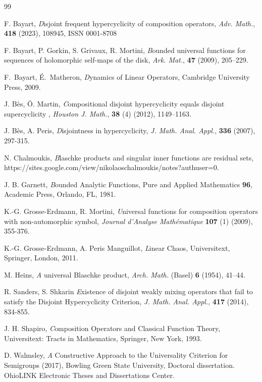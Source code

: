 \documentclass[12pt,a4paper]{amsart}
\theoremstyle{plain}
\theoremstyle{definition}
\theoremstyle{remark}
\theoremstyle{fact}
\begin{document}
    
    
    \begin{thebibliography}{99}

     F. Bayart, {\emph Disjoint frequent hypercyclicity of composition operators}, {\it Adv. Math.}, {\bf 418} (2023), 108945,
    ISSN 0001-8708 
	
	 F. Bayart, P. Gorkin, S. Grivaux, R. Mortini, {\emph Bounded universal functions for sequences of holomorphic self-maps of the disk}, 
	{\it Ark. Mat.}, {\bf 47} (2009), 205–229.

    F.~Bayart, \'E.~Matheron,
    {\emph Dynamics of Linear Operators}, 
    Cambridge University Press, 2009.

     J. B\`es, \"{O}. Martin, {\emph Compositional disjoint hypercyclicity equals disjoint supercyclicity }, {\it Houston J. Math.}, {\bf 38} (4) (2012), 1149--1163.
	
	 J. B\`es, A. Peris, {\emph Disjointness in hypercyclicity}, {\it J. Math. Anal. Appl.}, {\bf 336} (2007), 297-315.

     N. Chalmoukis, {\emph Blaschke products and singular inner functions are residual sets}, https://sites.google.com/view/nikolaoschalmoukis/notes?authuser=0.

     J. B. Garnett, {\emph Bounded Analytic Functions}, Pure and Applied Mathematics {\bf 96}, Academic Press, Orlando, FL, 1981.

     K.-G. Grosse-Erdmann, R. Mortini, {\emph Universal functions for composition operators with non-automorphic symbol},  {\it Journal d'Analyse Mathématique} {\bf 107} (1) (2009), 355-376.

    K.-G. Grosse-Erdmann, A. Peris Manguillot, 
    {\emph Linear Chaos}, Universitext, Springer, London, 2011.

     M. Heins, {\emph A universal Blaschke product}, {\it Arch. Math.} (Basel) \textbf{6} (1954), 41--44.

     R. Sanders, S. Shkarin {\emph Existence of disjoint weakly mixing operators that fail to satisfy the Disjoint Hypercyclicity Criterion}, {\it J. Math. Anal. Appl.}, {\bf 417} (2014), 834-855.

     J. H. Shapiro, {\emph Composition Operators and Classical Function Theory}, Universitext:
Tracts in Mathematics, Springer, New York, 1993.

     D. Walmsley, {\emph A Constructive Approach to the Universality Criterion for Semigroups} (2017), Bowling Green State University, Doctoral dissertation. OhioLINK Electronic Theses and Dissertations Center.

	
    \end{thebibliography}
\end{document}
